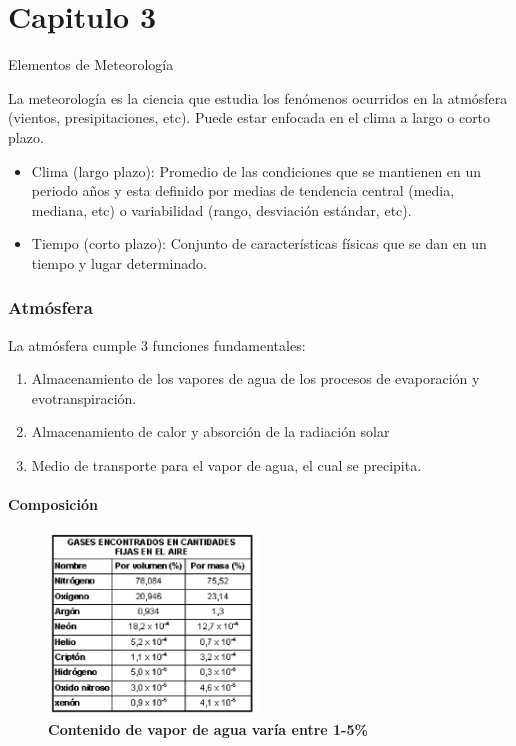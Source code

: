 \part{Capitulo 3}
\vspace{-0.3cm}

\begin{center}
    \begin{large}
        Elementos de Meteorología
    \end{large}
\end{center}

La meteorología es la ciencia que estudia los fenómenos ocurridos en la atmósfera (vientos, presipitaciones, etc). Puede estar enfocada en el clima a largo o corto plazo.

\begin{itemize}
    \item Clima (largo plazo): Promedio de las condiciones que se mantienen en un periodo años y esta definido por medias de tendencia central (media, mediana, etc) o variabilidad (rango, desviación estándar, etc).
    \item Tiempo (corto plazo): Conjunto de características físicas que se dan en un tiempo y lugar determinado.
\end{itemize}

\section{Atmósfera}
La atmósfera cumple 3 funciones fundamentales:

\begin{enumerate}
    \item Almacenamiento de los vapores de agua de los procesos de evaporación y evotranspiración.
    \item Almacenamiento de calor y absorción de la radiación solar
    \item Medio de transporte para el vapor de agua, el cual se precipita.
\end{enumerate}

\subsection{Composición}

\begin{figure}[H]
    \centering
    \includegraphics[width=0.5\textwidth]{imagenes/atm.png}
    \label{fig:composicion_atmosfera}
    \\
    \textbf{Contenido de vapor de agua varía entre 1-5\%}
\end{figure}

